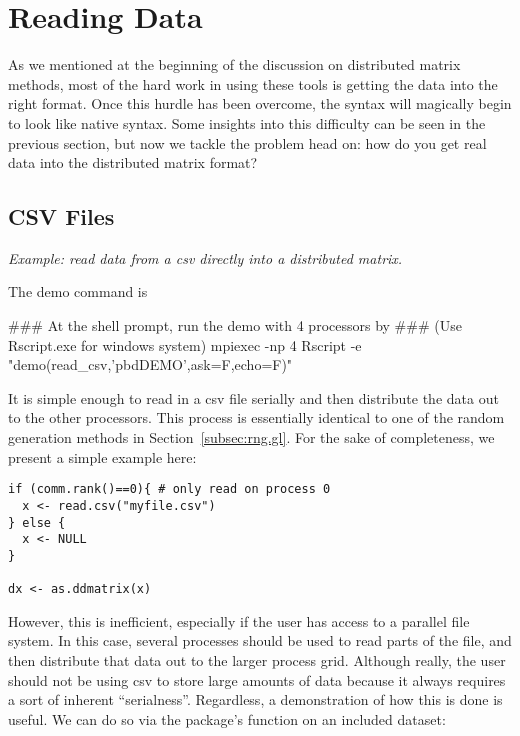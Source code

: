 \chapter{Reading Data}
\label{sec:reader}

As we mentioned at the beginning of the discussion on distributed matrix methods, most of the hard work in using these tools is getting the data into the right format.  Once this hurdle has been overcome, the syntax will magically begin to look like native  syntax.  Some insights into this difficulty can be seen in the previous section, but now we tackle the problem head on:  how do you get real data into the distributed matrix format?

\section{CSV Files}
\label{sec:csv_files}

\emph{Example:  read data from a csv directly into a distributed matrix.}

The demo command is
\begin{Command}
### At the shell prompt, run the demo with 4 processors by
### (Use Rscript.exe for windows system)
mpiexec -np 4 Rscript -e "demo(read_csv,'pbdDEMO',ask=F,echo=F)"
\end{Command}

It is simple enough to read in a csv file serially and then distribute the data out to the other processors.  This process is essentially identical to one of the random generation methods in Section~\ref{subsec:rng.gl}.  For the sake of completeness, we present a simple example here:

\begin{lstlisting}[language=rr]
if (comm.rank()==0){ # only read on process 0
  x <- read.csv("myfile.csv")
} else {
  x <- NULL
}

dx <- as.ddmatrix(x)
\end{lstlisting}

However, this is inefficient, especially if the user has access to a parallel file system.  In this case, several processes should be used to read parts of the file, and then distribute that data out to the larger process grid.  Although really, the user should not be using csv to store large amounts of data because it always requires a sort of inherent ``serialness''.  Regardless, a demonstration of how this is done is useful.  We can do so via the  package's function  on an included dataset:

